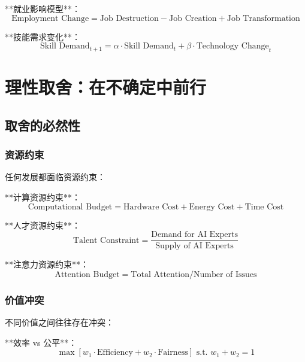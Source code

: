 **就业影响模型**：
\begin{equation}
\text{Employment Change} = \text{Job Destruction} - \text{Job Creation} + \text{Job Transformation}
\end{equation}

**技能需求变化**：
\begin{equation}
\text{Skill Demand}_{t+1} = \alpha \cdot \text{Skill Demand}_t + \beta \cdot \text{Technology Change}_t
\end{equation}

\section{理性取舍：在不确定中前行}

\subsection{取舍的必然性}

\subsubsection{资源约束}

任何发展都面临资源约束：

**计算资源约束**：
\begin{equation}
\text{Computational Budget} = \text{Hardware Cost} + \text{Energy Cost} + \text{Time Cost}
\end{equation}

**人才资源约束**：
\begin{equation}
\text{Talent Constraint} = \frac{\text{Demand for AI Experts}}{\text{Supply of AI Experts}}
\end{equation}

**注意力资源约束**：
\begin{equation}
\text{Attention Budget} = \text{Total Attention} / \text{Number of Issues}
\end{equation}

\subsubsection{价值冲突}

不同价值之间往往存在冲突：

**效率 vs 公平**：
\begin{equation}
\max \left[ w_1 \cdot \text{Efficiency} + w_2 \cdot \text{Fairness} \right] \text{ s.t. } w_1 + w_2 = 1
\end{equation}

